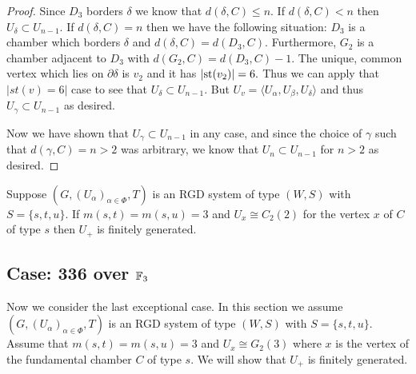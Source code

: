 \documentclass[class=book, crop=false]{standalone}
\begin{document}
\begin{proof}
Since $D_3$ borders $\delta$ we know that $d(\delta,C)\le n.$ If $d(\delta,C)<n$ then $U_{\delta}\subset U_{n-1}.$ If $d(\delta,C)=n$ then we have the following situation: $D_3$ is a chamber which borders $\delta$ and $d(\delta,C)=d(D_3,C).$ Furthermore, $G_2$ is a chamber adjacent to $D_3$ with $d(G_2,C)=d(D_3,C)-1.$ The unique, common vertex which lies on $\partial\delta$ is $v_2$ and it has $|\mathrm{st}(v_2)|=6.$ Thus we can apply that $|st(v)=6|$ case to see that $U_\delta\subset U_{n-1}.$ But $U_v=\langle U_\alpha,U_\beta,U_\delta\rangle$ and thus $U_\gamma\subset U_{n-1}$ as desired.

Now we have shown that $U_\gamma \subset U_{n-1}$ in any case, and since the choice of $\gamma$ such that $d(\gamma,C)=n>2$ was arbitrary, we know that $U_n\subset U_{n-1}$ for $n>2$ as desired.
\end{proof}

\begin{cor}
	\label{cor:334f2fg}
	Suppose $(G,(U_\alpha)_{\alpha\in \Phi},T)$ is an RGD system of type $(W,S)$ with $S=\{s,t,u\}.$ If $m(s,t)=m(s,u)=3$ and $U_x\cong C_2(2)$ for the vertex $x$ of $C$ of type $s$ then $U_+$ is finitely generated.
\end{cor}

\subsection{Case: 336 over $\mathbb{F}_{3}$}

Now we consider the last exceptional case. In this section we assume $(G,(U_\alpha)_{\alpha\in \Phi},T)$ is an RGD system of type $(W,S)$ with $S=\{s,t,u\}.$ Assume that $m(s,t)=m(s,u)=3$ and $U_x\cong G_2(3)$ where $x$ is the vertex of the fundamental chamber $C$ of type $s.$ We will show that $U_+$ is finitely generated.
\end{document}
